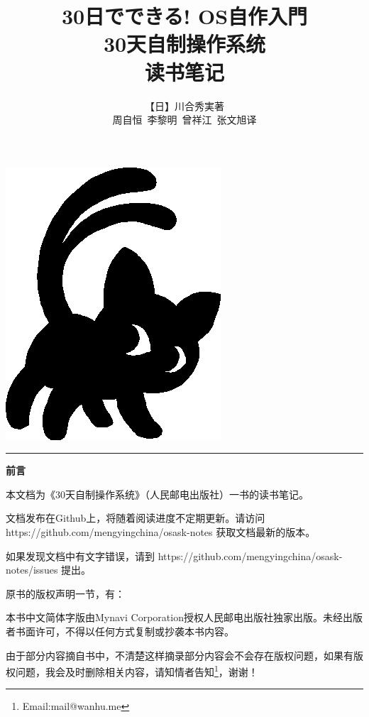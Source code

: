 \documentclass[12pt,a4paper,landscape,fancyhdr,fntef,oneside]{ctexbook}
\title{\hfill{\small \textbf{30日でできる! OS自作入門}}\\
\hfill \textbf{30天自制操作系统}\\
\hfill {\large\kaishu 读书笔记}}
\author{
		\hfill 【日】川合秀実\quad 著\\	
		\hfill 周自恒~李黎明~曾祥江~张文旭\quad 译\\	
}
\makeatletter
\renewenvironment{quote}
                {\kaishu
                 \list{}{\rightmargin   2em
                         \listparindent 2em
                         \itemindent    2em
                         \parsep        0em}
                 \item\relax}
                {\endlist}
\def\printtitle{%
    {\huge {\@title}\par}}		%
\def\printauthor{%
    {\large \@author}}				%
\renewcommand\maketitle{%
  \newpage
  \thispagestyle{empty}

\begin{minipage}{0.48\linewidth}
	
	\vspace{.2\textheight}
	\includegraphics[height=0.6\textheight]{Nekomata.jpg}\\	

\end{minipage} %
%
\begin{minipage}{0.02\linewidth}
	\vspace{.2\textheight}
	\rule{3pt}{0.6\textheight}
\end{minipage} %
%
\begin{minipage}{0.5\linewidth}
\begin{flushleft}
\vspace{.2\textheight}
\printtitle
\vspace{.2\textheight}
\printauthor
\end{flushleft}
\end{minipage}
\clearpage}
\makeatother
\begin{document}
\maketitle

\newpage
\thispagestyle{empty}
{\hfil \huge \textbf{前\hspace{2em}言}}\par
\vspace{.1\textheight}
本文档为《30天自制操作系统》（人民邮电出版社）一书的读书笔记。\par

文档发布在Github上，将随着阅读进度不定期更新。请访问 https://github.com/mengyingchina/osask-notes 获取文档最新的版本。\par

如果发现文档中有文字错误，请到 https://github.com/mengyingchina/osask-notes/issues 提出。

\vspace{1em}
原书的版权声明一节，有：
\begin{quote}
本书中文简体字版由Mynavi Corporation授权人民邮电出版社独家出版。未经出版者书面许可，不得以任何方式复制或抄袭本书内容。
\end{quote}

由于部分内容摘自书中，不清楚这样摘录部分内容会不会存在版权问题，如果有版权问题，我会及时删除相关内容，请知情者告知\footnote{Email:mail@wanhu.me}，谢谢！

\frontmatter
\tableofcontents

\mainmatter










%
%
%
%
%
%
%
%
%
%
%
%
%
%
%
%
%
%
%
%
%
%
%



\end{document}
